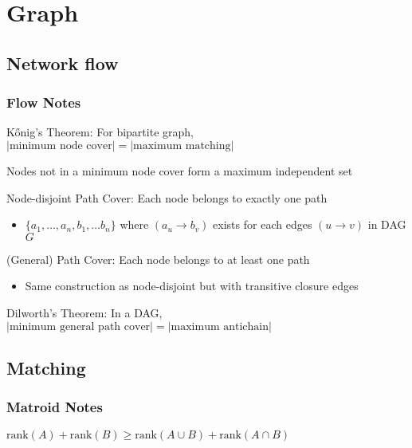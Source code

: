 \chapter{Graph}

\section{Network flow}

\subsection{Flow Notes}
    K\H{o}nig's Theorem: For bipartite graph, $|\text{minimum node cover}| = |\text{maximum matching}|$

    Nodes not in a minimum node cover form a maximum independent set

    Node-disjoint Path Cover: Each node belongs to exactly one path
    \begin{itemize}
     \setlength\itemsep{-1em}
     \item $\{a_1, \dots, a_n, b_1, \dots b_n\}$ where $(a_u \to b_v)$ exists for each edges $(u \to v)$ in DAG $G$
    \end{itemize}

    (General) Path Cover: Each node belongs to at least one path
    \begin{itemize}
     \setlength\itemsep{-1em}
     \item Same construction as node-disjoint but with transitive closure edges
    \end{itemize}

    Dilworth's Theorem: In a DAG, $|\text{minimum general path cover}| = |\text{maximum antichain}|$

\section{Matching}

\subsection{Matroid Notes}
    $\text{rank}(A) + \text{rank}(B) \geq \text{rank}(A \cup B) + \text{rank}(A \cap B)$

